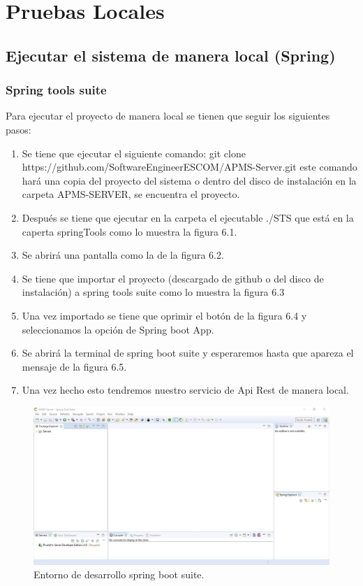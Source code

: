 \chapter{Pruebas Locales}

\section{Ejecutar el sistema de manera local (Spring)}

\subsection{Spring tools suite}
Para ejecutar el proyecto de manera local se tienen que seguir los siguientes pasos:
\begin{enumerate}
    \item Se tiene que ejecutar el siguiente comando: git clone https://github.com/SoftwareEngineerESCOM/APMS-Server.git este comando hará una copia del proyecto del sistema o dentro del disco de instalación en la carpeta APMS-SERVER, se encuentra el proyecto.
    \item Después se tiene que ejecutar en la carpeta el ejecutable ./STS que está en la caperta springTools como lo muestra la figura 6.1.
    \item Se abrirá una pantalla como la de la figura 6.2.
    \item Se tiene que importar el proyecto (descargado de github o del disco de instalación) a spring tools suite como lo muestra la figura 6.3
    \item Una vez importado se tiene que oprimir el botón de la figura 6.4 y seleccionamos la opción de Spring boot App.
    \item Se abrirá la terminal de spring boot suite y esperaremos hasta que apareza el mensaje de la figura 6.5.
    \item Una vez hecho esto tendremos nuestro servicio de Api Rest de manera local.
\end{enumerate}


\begin{figure}[H]
	\centering
	\includegraphics[width=0.7\linewidth]{images/tecnologias/spring.JPG}
	\caption{Entorno de desarrollo spring boot suite.}
\end{figure}


